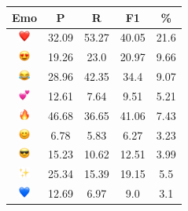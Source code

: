 \documentclass{article}
\begin{document}
\begin{table}
\centering
\begin{tabular}{|c|ccc|c|} \hline
\textbf{Emo} & \textbf{P} & \textbf{R} & \textbf{F1} & \textbf{\%} \\ \hline
\includegraphics[height=0.37cm,width=0.37cm]{img/red_heart.png} & 32.09 & 53.27 & 40.05 & 21.6\\ 
\includegraphics[height=0.37cm,width=0.37cm]{img/smiling_face_with_hearteyes.png} & 19.26 & 23.0 & 20.97 & 9.66\\ 
\includegraphics[height=0.37cm,width=0.37cm]{img/face_with_tears_of_joy.png} & 28.96 & 42.35 & 34.4 & 9.07\\ 
\includegraphics[height=0.37cm,width=0.37cm]{img/two_hearts.png} & 12.61 & 7.64 & 9.51 & 5.21\\ 
\includegraphics[height=0.37cm,width=0.37cm]{img/fire.png} & 46.68 & 36.65 & 41.06 & 7.43\\ 
\includegraphics[height=0.37cm,width=0.37cm]{img/smiling_face_with_smiling_eyes.png} & 6.78 & 5.83 & 6.27 & 3.23\\ 
\includegraphics[height=0.37cm,width=0.37cm]{img/smiling_face_with_sunglasses.png} & 15.23 & 10.62 & 12.51 & 3.99\\ 
\includegraphics[height=0.37cm,width=0.37cm]{img/sparkles.png} & 25.34 & 15.39 & 19.15 & 5.5\\ 
\includegraphics[height=0.37cm,width=0.37cm]{img/blue_heart.png} & 12.69 & 6.97 & 9.0 & 3.1\\ 

\end{tabular}
\end{table}
\end{document}
